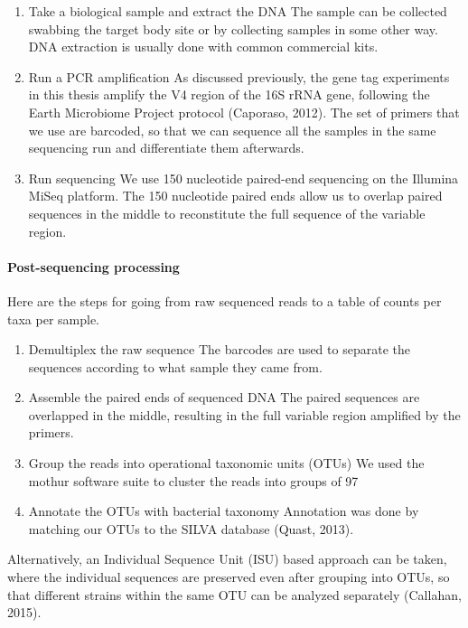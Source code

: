 \begin{enumerate}
\item Take a biological sample and extract the DNA
The sample can be collected swabbing the target body site or by collecting samples in some other way. DNA extraction is usually done with common commercial kits.

\item Run a PCR amplification
As discussed previously, the gene tag experiments in this thesis amplify the V4 region of the 16S rRNA gene, following the Earth Microbiome Project protocol (Caporaso, 2012). The set of primers that we use are barcoded, so that we can sequence all the samples in the same sequencing run and differentiate them afterwards.

\item Run sequencing
We use 150 nucleotide paired-end sequencing on the Illumina MiSeq platform. The 150 nucleotide paired ends allow us to overlap paired sequences in the middle to reconstitute the full sequence of the variable region.
\end{enumerate}

\paragraph{Post-sequencing processing}
Here are the steps for going from raw sequenced reads to a table of counts per taxa per sample.
\begin{enumerate}
\item Demultiplex the raw sequence
The barcodes are used to separate the sequences according to what sample they came from.

\item Assemble the paired ends of sequenced DNA
The paired sequences are overlapped in the middle, resulting in the full variable region amplified by the primers.

\item Group the reads into operational taxonomic units (OTUs)
We used the mothur software suite to cluster the reads into groups of 97%

\item Annotate the OTUs with bacterial taxonomy
Annotation was done by  matching our OTUs to the SILVA database (Quast, 2013).
\end{enumerate}

Alternatively, an Individual Sequence Unit (ISU) based approach can be taken, where the individual sequences are preserved even after grouping into OTUs, so that different strains within the same OTU can be analyzed separately (Callahan, 2015).

